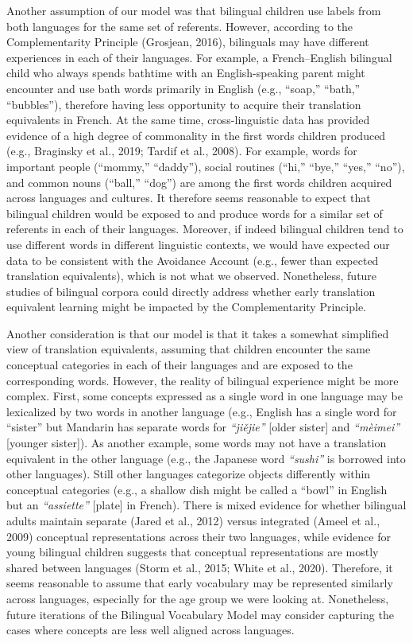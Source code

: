 \documentclass[
  english,
  ,man,floatsintext]{apa6}
\begin{document}
Another assumption of our model was that bilingual children use labels from both languages for the same set of referents. However, according to the Complementarity Principle (Grosjean, 2016), bilinguals may have different experiences in each of their languages. For example, a French--English bilingual child who always spends bathtime with an English-speaking parent might encounter and use bath words primarily in English (e.g., ``soap,'' ``bath,'' ``bubbles''), therefore having less opportunity to acquire their translation equivalents in French. At the same time, cross-linguistic data has provided evidence of a high degree of commonality in the first words children produced (e.g., Braginsky et al., 2019; Tardif et al., 2008). For example, words for important people (``mommy,'' ``daddy''), social routines (``hi,'' ``bye,'' ``yes,'' ``no''), and common nouns (``ball,'' ``dog'') are among the first words children acquired across languages and cultures. It therefore seems reasonable to expect that bilingual children would be exposed to and produce words for a similar set of referents in each of their languages. Moreover, if indeed bilingual children tend to use different words in different linguistic contexts, we would have expected our data to be consistent with the Avoidance Account (e.g., fewer than expected translation equivalents), which is not what we observed. Nonetheless, future studies of bilingual corpora could directly address whether early translation equivalent learning might be impacted by the Complementarity Principle.

Another consideration is that our model is that it takes a somewhat simplified view of translation equivalents, assuming that children encounter the same conceptual categories in each of their languages and are exposed to the corresponding words. However, the reality of bilingual experience might be more complex. First, some concepts expressed as a single word in one language may be lexicalized by two words in another language (e.g., English has a single word for ``sister'' but Mandarin has separate words for \emph{``jiějie''} {[}older sister{]} and \emph{``mèimei''} {[}younger sister{]}). As another example, some words may not have a translation equivalent in the other language (e.g., the Japanese word \emph{``sushi''} is borrowed into other languages). Still other languages categorize objects differently within conceptual categories (e.g., a shallow dish might be called a ``bowl'' in English but an \emph{``assiette''} {[}plate{]} in French). There is mixed evidence for whether bilingual adults maintain separate (Jared et al., 2012) versus integrated (Ameel et al., 2009) conceptual representations across their two languages, while evidence for young bilingual children suggests that conceptual representations are mostly shared between languages (Storm et al., 2015; White et al., 2020). Therefore, it seems reasonable to assume that early vocabulary may be represented similarly across languages, especially for the age group we were looking at. Nonetheless, future iterations of the Bilingual Vocabulary Model may consider capturing the cases where concepts are less well aligned across languages.
\end{document}
